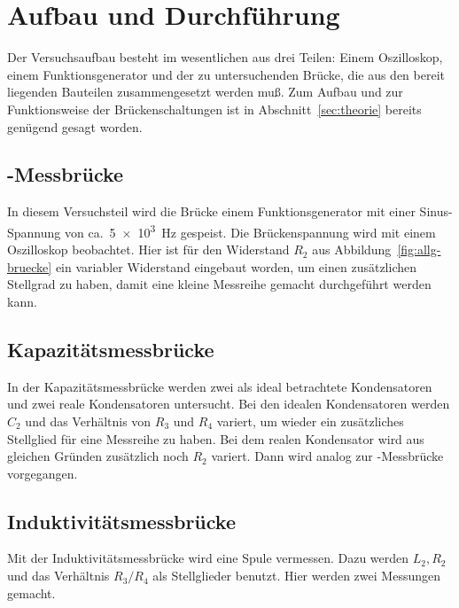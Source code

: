 
\section{Aufbau und Durchführung}

Der Versuchsaufbau besteht im wesentlichen aus drei Teilen: Einem
Oszilloskop, einem Funktionsgenerator und der zu untersuchenden Brücke,
die aus den bereit liegenden Bauteilen zusammengesetzt werden muß. Zum
Aufbau und zur Funktionsweise der Brückenschaltungen ist in
Abschnitt~\ref{sec:theorie} bereits genügend gesagt worden.

\subsection{-Messbrücke}

In diesem Versuchsteil wird die Brücke einem Funktionsgenerator mit
einer Sinus-Spannung von ca.~\SI{5e3}{\hertz} gespeist. Die
Brückenspannung wird mit einem Oszilloskop beobachtet. Hier ist für den
Widerstand $R_2$ aus Abbildung~\vref{fig:allg-bruecke} ein variabler
Widerstand eingebaut worden, um einen zusätzlichen Stellgrad zu haben,
damit eine kleine Messreihe gemacht durchgeführt werden kann.

\subsection{Kapazitätsmessbrücke}

In der Kapazitätsmessbrücke werden zwei als ideal betrachtete
Kondensatoren und zwei reale Kondensatoren untersucht. Bei den idealen
Kondensatoren werden $C_2$ und das Verhältnis von $R_3$ und $R_4$
variert, um wieder ein zusätzliches Stellglied für eine Messreihe zu
haben. Bei dem realen Kondensator wird aus gleichen Gründen zusätzlich
noch $R_2$ variert. Dann wird analog zur -Messbrücke
vorgegangen. 

\subsection{Induktivitätsmessbrücke}

Mit der Induktivitätsmessbrücke wird eine Spule vermessen. Dazu werden
$L_2, R_2$ und das Verhältnis $R_3/R_4$ als Stellglieder benutzt. Hier
werden zwei Messungen gemacht.

